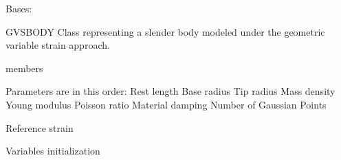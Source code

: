 \documentclass[letterpaper,10pt,english]{sphinxmanual}
\begin{document}
\begin{fulllineitems}
\label{\detokenize{gvsbody:GVSBody}}
\pysigstartsignatures
{}
\pysigstopsignatures
\sphinxAtStartPar
Bases: {\hyperref[\detokenize{body:Body}]{}}

\sphinxAtStartPar
GVSBODY Class representing a slender body modeled under the geometric
variable strain approach.

\begin{sphinxuseclass}{members}\begin{description}

\begin{fulllineitems}
\label{\detokenize{gvsbody:GVSBody.Parameters}}
\pysigstartsignatures
{}
\pysigstopsignatures
\sphinxAtStartPar
Parameters are in this order:
\sphinxhyphen{}Rest length
\sphinxhyphen{}Base radius
\sphinxhyphen{}Tip radius
\sphinxhyphen{}Mass density
\sphinxhyphen{}Young modulus
\sphinxhyphen{}Poisson ratio
\sphinxhyphen{}Material damping
\sphinxhyphen{}Number of Gaussian Points

\end{fulllineitems}


\begin{fulllineitems}
\label{\detokenize{gvsbody:GVSBody.ReferenceStrain}}
\pysigstartsignatures
{}
\pysigstopsignatures
\sphinxAtStartPar
Reference strain

\end{fulllineitems}



\begin{fulllineitems}
\label{\detokenize{gvsbody:GVSBody.D}}
\pysigstartsignatures
{}
\pysigstopsignatures
\sphinxAtStartPar
Variables initialization

\end{fulllineitems}


\end{description}
\end{sphinxuseclass}
\end{fulllineitems}
\end{document}
